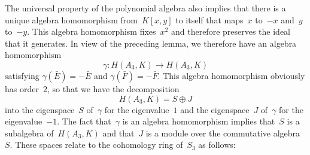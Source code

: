 \documentclass[12pt]{article}
\theoremstyle{definition}
\theoremstyle{break}
\renewcommand{\1}{\mathbbm{1}}
\begin{document}
The universal property of the polynomial algebra also implies that there is a unique algebra homomorphism from~$K[x,y]$ to itself that maps~$x$ to~$-x$ and~$y$ to~$-y$. This algebra homomorphism fixes~$x^2$ and therefore preserves the ideal that it generates. In view of the preceding lemma, we therefore have an algebra homomorphism
\[\gamma \colon H(A_3, K) \to H(A_3, K)\]
satisfying $\gamma(\bar{E}) = - \bar{E}$ and $\gamma(\bar{F}) = -\bar{F}$. This algebra homomorphism obviously has order~$2$, so that we have the decomposition
\[H(A_3, K) = S \oplus J\]
into the eigenspace~$S$ of~$\gamma$ for the eigenvalue~$1$ and the eigenspace~$J$ of~$\gamma$ for the eigenvalue~$-1$. The fact that~$\gamma$ is an algebra homomorphism implies that~$S$ is a subalgebra of~$H(A_3, K)$ and that~$J$ is a module over the commutative algebra~$S$. These spaces relate to the cohomology ring of~$S_3$ as follows:
\end{document}
